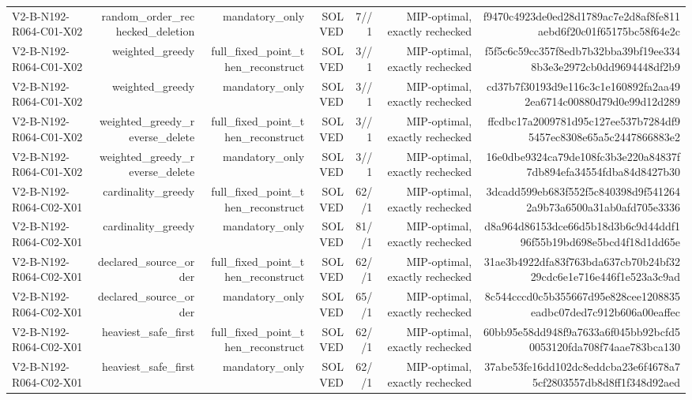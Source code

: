 {\begin{longtable}{lrrrrrr}
V2-B-N192-R064-C01-X02 & random\_order\_rechecked\_deletion & mandatory\_only & SOLVED & 7//1 & MIP-optimal, exactly rechecked & f9470c4923de0ed28d1789ac7e2d8af8fe811aebd6f20c01f65175bc58f64e2c \\
V2-B-N192-R064-C01-X02 & weighted\_greedy & full\_fixed\_point\_then\_reconstruct & SOLVED & 3//1 & MIP-optimal, exactly rechecked & f5f5c6c59cc357f8edb7b32bba39bf19ee3348b3e3e2972cb0dd9694448df2b9 \\
V2-B-N192-R064-C01-X02 & weighted\_greedy & mandatory\_only & SOLVED & 3//1 & MIP-optimal, exactly rechecked & cd37b7f30193d9e116c3c1e160892fa2aa492ea6714c00880d79d0e99d12d289 \\
V2-B-N192-R064-C01-X02 & weighted\_greedy\_reverse\_delete & full\_fixed\_point\_then\_reconstruct & SOLVED & 3//1 & MIP-optimal, exactly rechecked & ffcdbc17a2009781d95c127ee537b7284df95457ec8308e65a5c2447866883e2 \\
V2-B-N192-R064-C01-X02 & weighted\_greedy\_reverse\_delete & mandatory\_only & SOLVED & 3//1 & MIP-optimal, exactly rechecked & 16e0dbe9324ca79de108fc3b3e220a84837f7db894efa34554fdba84d8427b30 \\
V2-B-N192-R064-C02-X01 & cardinality\_greedy & full\_fixed\_point\_then\_reconstruct & SOLVED & 62//1 & MIP-optimal, exactly rechecked & 3dcadd599eb683f552f5c840398d9f5412642a9b73a6500a31ab0afd705e3336 \\
V2-B-N192-R064-C02-X01 & cardinality\_greedy & mandatory\_only & SOLVED & 81//1 & MIP-optimal, exactly rechecked & d8a964d86153dce66d5b18d3b6c9d44ddf196f55b19bd698e5bcd4f18d1dd65e \\
V2-B-N192-R064-C02-X01 & declared\_source\_order & full\_fixed\_point\_then\_reconstruct & SOLVED & 62//1 & MIP-optimal, exactly rechecked & 31ae3b4922dfa83f763bda637cb70b24bf3229cdc6e1e716e446f1e523a3c9ad \\
V2-B-N192-R064-C02-X01 & declared\_source\_order & mandatory\_only & SOLVED & 65//1 & MIP-optimal, exactly rechecked & 8c544cccd0c5b355667d95e828cee1208835eadbc07ded7c912b606a00eaffec \\
V2-B-N192-R064-C02-X01 & heaviest\_safe\_first & full\_fixed\_point\_then\_reconstruct & SOLVED & 62//1 & MIP-optimal, exactly rechecked & 60bb95e58dd948f9a7633a6f045bb92bcfd50053120fda708f74aae783bca130 \\
V2-B-N192-R064-C02-X01 & heaviest\_safe\_first & mandatory\_only & SOLVED & 62//1 & MIP-optimal, exactly rechecked & 37abe53fe16dd102dc8eddcba23e6f4678a75cf2803557db8d8ff1f348d92aed \\

\end{longtable}}
